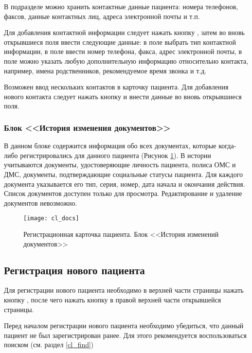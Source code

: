 В подразделе  можно хранить контактные данные пациента: номера телефонов, факсов, данные контактных лиц, адреса электронной почты и т.п.

Для добавления контактной информации следует нажать кнопку , затем во вновь открывшиеся поля ввести следующие данные: в поле  выбрать тип контактной информации, в поле  ввести номер телефона, факса, адрес электронной почты, в поле  можно указать любую дополнительную информацию относительно контакта, например, имена родственников, рекомендуемое время звонка и т.д.

Возможен ввод нескольких контактов в карточку пациента. Для добавления нового контакта следует нажать кнопку  и внести данные во вновь открывшиеся поля.

\subsubsection{Блок <<История изменения документов>>} \label{cl_docs}

В данном блоке содержится информация обо всех документах, которые когда-либо регистрировались для данного пациента (Рисунок \ref{img_cl_docs}). В истории учитываются документы, удостоверяющие личность пациента, полиса ОМС и ДМС, документы, подтверждающие социальные статусы пациента. Для каждого документа указывается его тип, серия, номер, дата начала и окончания действия. Список документов доступен только для просмотра. Редактирование и удаление документов невозможно. 

\begin{figure}[ht]\centering
 \texttt{[image: cl\_docs]}
 \caption{Регистрационная карточка пациента. Блок <<История изменений документов>>}
 \label{img_cl_docs}
\end{figure} 


\subsection{Регистрация нового пациента} \label{cl_new}

Для регистрации нового пациента необходимо в верхней части страницы нажать кнопку , после чего нажать кнопку   в правой верхней части открывшейся страницы.

\begin{vnim}
Перед началом регистрации нового пациента необходимо убедиться, что данный пациент не был зарегистрирован ранее. Для этого рекомендуется воспользоваться поиском (см. раздел \ref{cl_find})
\end{vnim}

